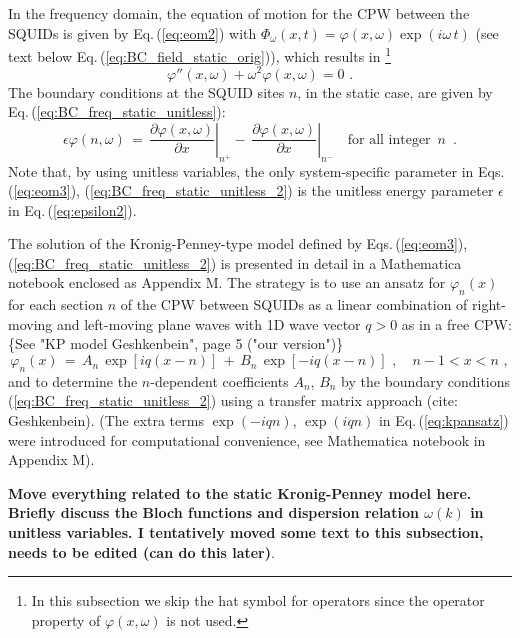 In the frequency domain, the equation of motion for the CPW between the SQUIDs is given by
Eq.\,(\ref{eq:eom2}) with 
$\Phi_{\omega}(x, t) = \varphi(x,\omega) \exp(i \omega \, t)$ 
(see text below Eq.\,(\ref{eq:BC_field_static_orig})), which results in
\footnote{In this subsection we skip the hat symbol for operators since the operator property 
of $\varphi(x,\omega)$ is not used.}
%
\begin{equation} \label{eq:eom3}
\varphi''(x,\omega) + \omega^2 \varphi(x,\omega) = 0 \, \, .
\end{equation}
% 
The boundary conditions at the SQUID sites $n$, in the static case, 
are given by Eq.\,(\ref{eq:BC_freq_static_unitless}):
%
\begin{equation}\label{eq:BC_freq_static_unitless_2}
\epsilon \varphi(n, \omega) \, = \, 
\left.\frac{\partial \varphi(x, \omega)}{\partial x}\right|_{n^{+}}
- \, \left.\frac{\partial \varphi(x,\omega)}{\partial x}\right|_{n^{-}} \quad \text{for all integer} \, \, \, n \, \, \, .
\end{equation}
%
Note that, by using unitless variables, the only system-specific parameter in 
Eqs.\,(\ref{eq:eom3}), (\ref{eq:BC_freq_static_unitless_2}) is the unitless energy parameter 
$\epsilon$ in Eq.\,(\ref{eq:epsilon2}). 

The solution of the Kronig-Penney-type model defined by 
Eqs.\,(\ref{eq:eom3}), (\ref{eq:BC_freq_static_unitless_2}) is presented in detail in  
\color{red}
a Mathematica notebook enclosed as Appendix M.
\color{black}
The strategy is to use an ansatz for $\varphi_n(x)$ for each section $n$ of the CPW
between SQUIDs as a linear combination of right-moving
and left-moving plane waves with 1D wave vector $q>0$ as in a free CPW:
\color{red}
\{See "KP model Geshkenbein", page 5 ("our version")\}
\color{black}
%
\begin{equation} \label{eq:kpansatz}
\varphi_n(x) \, = \, A_n \, \exp\left[i q (x-n) \right] \, + \, 
B_n \, \exp\left[-i q (x-n) \right] \, \, , \quad n-1 < x < n \, \, ,
\end{equation}
%
and to determine the $n$-dependent coefficients $A_n$, $B_n$ by the boundary conditions 
(\ref{eq:BC_freq_static_unitless_2}) using a transfer matrix approach 
\color{red}
(cite: Geshkenbein).
\color{black}
(The extra terms $\exp(- i q n)$, $\exp(i q n)$ in Eq.\,(\ref{eq:kpansatz}) were introduced 
for computational convenience, see 
\color{red}
Mathematica notebook in Appendix M).
\color{black}

\color{red} 
{\bf Move everything related to the static Kronig-Penney model here. 
Briefly discuss the Bloch functions and dispersion relation $\omega(k)$ in unitless variables. 
I tentatively moved some text to this subsection, needs to be edited (can do this later)}.  
\color{black}

